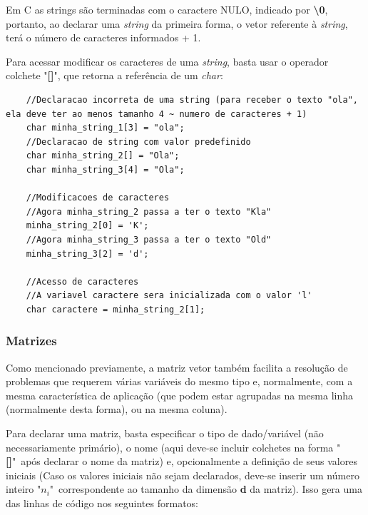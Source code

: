\documentclass[12pt]{article}
\newcommand\tab[1][1cm]{\hspace*{#1}}
\begin{document}
\hspace{0.25cm}
\begin{tcolorbox}[colback=yellow!5!white,colframe=yellow!75!black,title=Atenção!]
  \par\tab Em C as strings são terminadas com o caractere NULO, indicado por \textbf{\textbackslash 0}, portanto, ao declarar uma \textit{string} da primeira forma, o vetor referente à \textit{string}, terá o número de caracteres informados + 1.
\end{tcolorbox}

\par\tab Para acessar modificar os caracteres de uma \textit{string}, basta usar o operador colchete "\textbf{[]}", que retorna a referência de um \textit{char}:

\hspace{0.25cm}
\begin{lstlisting}
    //Declaracao incorreta de uma string (para receber o texto "ola", ela deve ter ao menos tamanho 4 ~ numero de caracteres + 1)
    char minha_string_1[3] = "ola";
    //Declaracao de string com valor predefinido
    char minha_string_2[] = "Ola";
    char minha_string_3[4] = "Ola";
    
    //Modificacoes de caracteres
    //Agora minha_string_2 passa a ter o texto "Kla"
    minha_string_2[0] = 'K';
    //Agora minha_string_3 passa a ter o texto "Old"
    minha_string_3[2] = 'd';
    
    //Acesso de caracteres
    //A variavel caractere sera inicializada com o valor 'l'
    char caractere = minha_string_2[1];
\end{lstlisting}

\subsubsection{Matrizes}

\par\tab Como mencionado previamente, a matriz vetor também facilita a resolução de problemas que requerem várias variáveis do mesmo tipo e, normalmente, com a mesma característica de aplicação (que podem estar agrupadas na mesma linha (normalmente desta forma), ou na mesma coluna).

\par\tab Para declarar uma matriz, basta especificar o tipo de dado/variável (não necessariamente primário), o nome (aqui deve-se incluir colchetes na forma "\textbf{[]}"~após declarar o nome da matriz) e, opcionalmente a definição de seus valores iniciais (Caso os valores iniciais não sejam declarados, deve-se inserir um número inteiro "\textbf{$n_i$}"~correspondente ao tamanho da dimensão \textbf{d} da matriz). Isso gera uma das linhas de código nos seguintes formatos:
\end{document}
